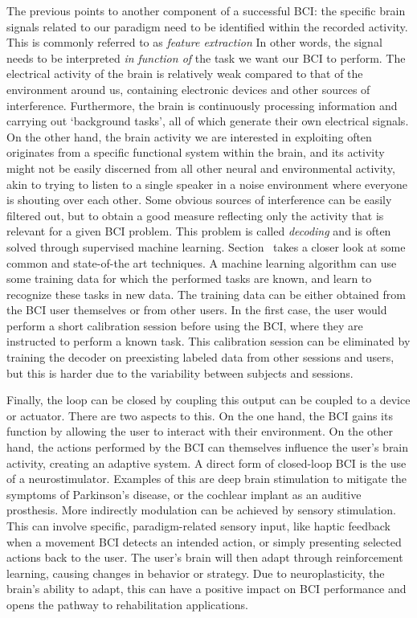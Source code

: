 The previous points to another component of a successful BCI: the specific
brain signals related to our paradigm need to be identified within the recorded
activity.
This is commonly referred to as \emph{feature extraction}
In other words, the signal needs to be interpreted \emph{in function of} the
task we want our BCI to perform.
The electrical activity of the brain is relatively weak compared to that of the
environment around us, containing electronic devices and other sources of
interference.
Furthermore, the brain is continuously processing information and carrying out
`background tasks', all of which generate their own electrical signals.
On the other hand, the brain activity we are interested in exploiting often
originates from a specific functional system within the brain, and its activity
might not be easily discerned from all other neural and environmental activity,
akin to trying to listen to a single speaker in a noise environment where
everyone is shouting over each other.
Some obvious sources of interference can be easily filtered out, but to obtain
a good measure reflecting only the activity that is relevant for a given BCI
problem.
This problem is called \emph{decoding} and is often solved through supervised
machine learning.
Section~\label{sec:bci-decoding} takes a closer look at some common and
state-of-the art techniques.
A machine learning algorithm can use some training data for which the performed
tasks are known, and learn to recognize these tasks in new data.
The training data can be either obtained from the BCI user themselves or from
other users.
In the first case, the user would perform a short calibration session before
using the BCI, where they are instructed to perform a known task.
This calibration session can be eliminated by training the decoder on
preexisting labeled data from other sessions and users, but this is harder due
to the variability between subjects and sessions.

Finally, the loop can be closed by coupling this output can be coupled to a
device or actuator.
There are two aspects to this.
On the one hand, the BCI gains its function by allowing the user to interact
with their environment.
On the other hand, the actions performed by the BCI can themselves influence
the user's brain activity, creating an adaptive system.
A direct form of closed-loop BCI is the use of a neurostimulator.
Examples of this are deep brain stimulation to mitigate the symptoms of
Parkinson's disease, or the cochlear implant as an auditive prosthesis.
More indirectly modulation can be achieved by sensory stimulation.
This can involve specific, paradigm-related sensory input, like haptic feedback when a
movement BCI detects an intended action, or simply presenting selected actions
back to the user.
The user's brain will then adapt through reinforcement learning, causing
changes in behavior or strategy.
Due to neuroplasticity, the brain's ability to adapt, this can have a positive
impact on BCI performance and opens the pathway to rehabilitation applications.

